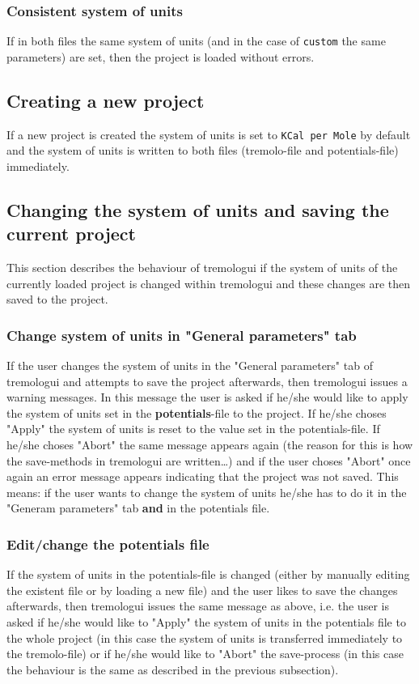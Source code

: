 \documentclass[11pt]{article}
\begin{document}
\subsubsection{Consistent system of units}
\label{sec-1-1-5}
If in both files the same system of units (and in the case of \texttt{custom} the same
parameters) are set, then the project is loaded without errors.
\subsection{Creating a new project}
\label{sec-1-2}
If a new project is created the system of units is set to \texttt{KCal per Mole} by
default and the system of units is written to both files (tremolo-file and
potentials-file) immediately.
\subsection{Changing the system of units and saving the current project}
\label{sec-1-3}
This section describes the behaviour of tremologui if the system of units of
the currently loaded project is changed within tremologui and these changes are
then saved to the project.
\subsubsection{Change system of units in "General parameters" tab}
\label{sec-1-3-1}
If the user changes the system of units in the "General parameters" tab of
tremologui and attempts to save the project afterwards, then tremologui issues
a warning messages. In this message the user is asked if he/she would like to
apply the system of units set in the \textbf{potentials}-file to the project.
If he/she choses "Apply" the system of units is reset to the value set in the
potentials-file. If he/she choses "Abort" the same message appears again (the
reason for this is how the save-methods in tremologui are written\ldots{}) and if
the user choses "Abort" once again an error message appears indicating that the
project was not saved.
This means: if the user wants to change the system of units he/she has to do
it in the "Generam parameters" tab \textbf{and} in the potentials file.
\subsubsection{Edit/change the potentials file}
\label{sec-1-3-2}
If the system of units in the potentials-file is changed (either by manually
editing the existent file or by loading a new file) and the user likes to
save the changes afterwards, then tremologui issues the same message as above,
i.e. the user is asked if he/she would like to "Apply" the system of units in
the potentials file to the whole project (in this case the system of units is
transferred immediately to the tremolo-file) or if he/she would like to "Abort"
the save-process (in this case the behaviour is the same as described in the
previous subsection).
\end{document}
